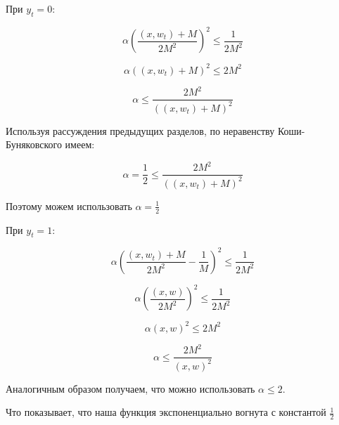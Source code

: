 \documentclass[12pt]{article}
\theoremstyle{definition}
\begin{document}
При $y_t = 0:$

$$ \alpha \left(\frac{(x, w_t) + M}{2M^2}\right)^2 \leqslant \frac{1}{2M^2}$$

$$ \alpha ((x, w_t) + M)^2 \leqslant 2M^2 $$

$$ \alpha \leqslant \frac{2M^2}{((x, w_t) + M)^2} $$

Используя рассуждения предыдущих разделов, по неравенству Коши-Буняковского имеем:

$$ \alpha = \frac{1}{2} \leqslant \frac{2M^2}{((x, w_t) + M)^2} $$

Поэтому можем использовать $\alpha = \frac{1}{2}$

При $y_t = 1:$

$$ \alpha \left(\frac{(x, w_t) + M}{2M^2} - \frac{1}{M}\right)^2 \leqslant \frac{1}{2M^2} $$

$$ \alpha \left(\frac{(x, w)}{2M^2}\right)^2 \leqslant \frac{1}{2M^2} $$

$$ \alpha (x, w)^2 \leqslant 2M^2 $$

$$ \alpha \leqslant \frac{2M^2}{(x, w)^2}$$

Аналогичным образом получаем, что можно использовать $\alpha \leqslant 2$.

Что показывает, что наша функция экспоненциально вогнута с константой $\frac{1}{2}$
\end{document}
